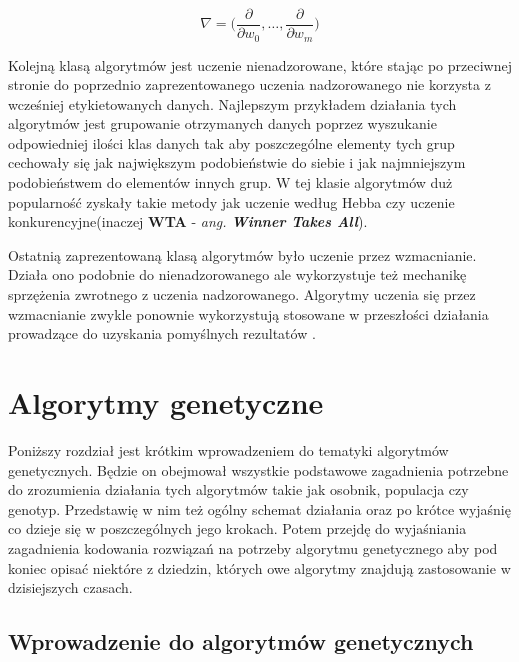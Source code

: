 \documentclass[12pt, oneside, a4paper]{report}
\begin{document}
\begin{equation}\label{eq: 2.gradient-2}
	\nabla = \bigg( \frac{\partial}{\partial w_0}, \dots ,\frac{\partial}{\partial w_m} \bigg)
\end{equation}

Kolejną klasą algorytmów jest uczenie nienadzorowane, które stając po przeciwnej stronie do poprzednio zaprezentowanego uczenia nadzorowanego nie korzysta z wcześniej etykietowanych danych. Najlepszym przykładem działania tych algorytmów jest grupowanie otrzymanych danych poprzez wyszukanie odpowiedniej ilości klas danych tak aby poszczególne elementy tych grup cechowały się jak największym podobieństwie do siebie i jak najmniejszym podobieństwem do elementów innych grup. W tej klasie algorytmów duż popularność zyskały takie metody jak uczenie według Hebba czy uczenie konkurencyjne(inaczej \textbf{WTA} - \textit{ang. \textbf{Winner Takes All}}).

Ostatnią zaprezentowaną klasą algorytmów było uczenie przez wzmacnianie. Działa ono podobnie do nienadzorowanego ale wykorzystuje też mechanikę sprzężenia zwrotnego z uczenia nadzorowanego. Algorytmy uczenia się przez wzmacnianie zwykle ponownie wykorzystują stosowane w przeszłości działania prowadzące do uzyskania pomyślnych rezultatów \citep{roelants2017deeplearning}.




\chapter{Algorytmy genetyczne}

Poniższy rozdział jest krótkim wprowadzeniem do tematyki algorytmów genetycznych. Będzie on obejmował wszystkie podstawowe zagadnienia potrzebne do zrozumienia działania tych algorytmów takie jak osobnik, populacja czy genotyp. Przedstawię w nim też ogólny schemat działania oraz po krótce wyjaśnię co dzieje się w poszczególnych jego krokach. Potem przejdę do wyjaśniania zagadnienia kodowania rozwiązań na potrzeby algorytmu genetycznego aby pod koniec opisać niektóre z dziedzin, których owe algorytmy znajdują zastosowanie w dzisiejszych czasach.

\section{Wprowadzenie do algorytmów genetycznych}
\end{document}
